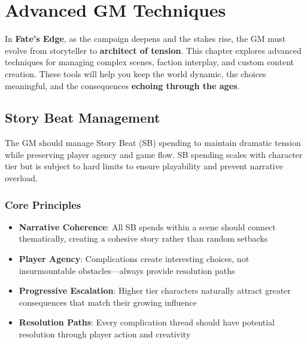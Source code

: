 \chapter{Advanced GM Techniques}

In \textbf{Fate's Edge}, as the campaign deepens and the stakes rise, the GM must evolve from storyteller to \textbf{architect of tension}. This chapter explores advanced techniques for managing complex scenes, faction interplay, and custom content creation. These tools will help you keep the world dynamic, the choices meaningful, and the consequences \textbf{echoing through the ages}.

\section*{Story Beat Management}

The GM should manage Story Beat (SB) spending to maintain dramatic tension while preserving player agency and game flow. SB spending scales with character tier but is subject to hard limits to ensure playability and prevent narrative overload.

\subsection*{Core Principles}
\begin{itemize}
    \item \textbf{Narrative Coherence}: All SB spends within a scene should connect thematically, creating a cohesive story rather than random setbacks
    \item \textbf{Player Agency}: Complications create interesting choices, not insurmountable obstacles---always provide resolution paths
    \item \textbf{Progressive Escalation}: Higher tier characters naturally attract greater consequences that match their growing influence
    \item \textbf{Resolution Paths}: Every complication thread should have potential resolution through player action and creativity
\end{itemize}

